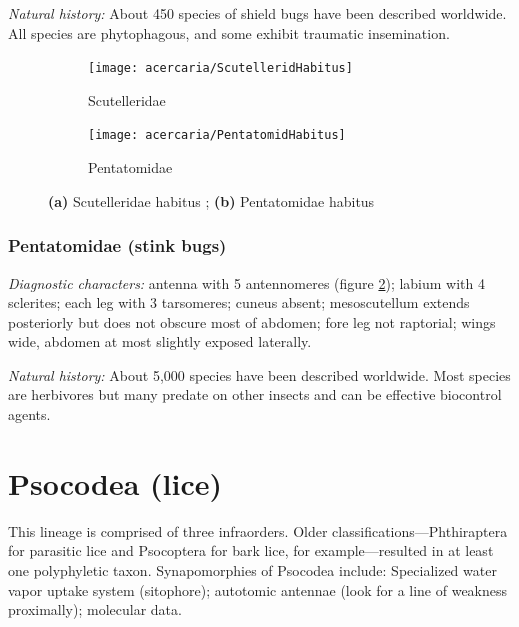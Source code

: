 \noindent{}\textit{Natural history:} About 450 species of shield bugs have been described worldwide. All species are phytophagous, and some exhibit traumatic insemination.\vspace{3mm}

\begin{figure}[ht!]
 \centering
\begin{subfigure}[ht!]{0.32\textwidth}
 \texttt{[image: acercaria/ScutelleridHabitus]}
 \caption{Scutelleridae}
 \label{fig:scutellerid1}
\end{subfigure}
 \hfill 
\begin{subfigure}[ht!]{0.48\textwidth}
 \texttt{[image: acercaria/PentatomidHabitus]}
 \caption{Pentatomidae}
 \label{fig:pentatomid1}
\end{subfigure}
 \caption{\textbf{(a)} Scutelleridae habitus \citep[redrawn from][Plate XXXI, Fig. 11]{bhlitem82061AustrInsect}; \textbf{(b)} Pentatomidae habitus \citep[][Fig. 44]{bhlitem105840ross}}\label{fig:pentscut}
\end{figure}

\subsubsection{Pentatomidae (stink bugs)}
\noindent{}\textit{Diagnostic characters:} antenna with 5 antennomeres (figure \ref{fig:pentatomid1}); labium with 4 sclerites; each leg with 3 tarsomeres; cuneus absent; mesoscutellum extends posteriorly but does not obscure most of abdomen; fore leg not raptorial; wings wide, abdomen at most slightly exposed laterally.\vspace{3mm}

\noindent{}\textit{Natural history:} About 5,000 species have been described worldwide. Most species are herbivores but many predate on other insects and can be effective biocontrol agents.\vspace{3mm}

\section{Psocodea (lice)}
This lineage is comprised of three infraorders. Older classifications---Phthiraptera for parasitic lice and Psocoptera for bark lice, for example---resulted in at least one polyphyletic taxon. Synapomorphies of Psocodea include: Specialized water vapor uptake system (sitophore); autotomic antennae (look for a line of weakness proximally); molecular data.\vspace{3mm}

